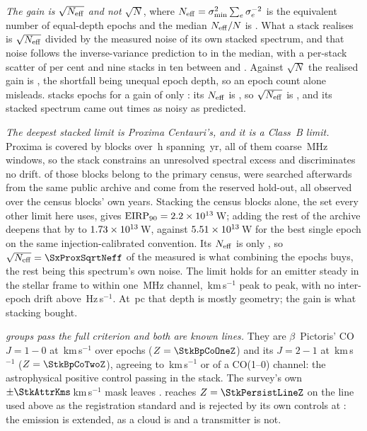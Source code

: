 \emph{The gain is $\sqrt{N_{\rm eff}}$ and not $\sqrt{N}$}, where
$N_{\rm eff}=\sigma_{\min}^{2}\sum_e\sigma_e^{-2}$ is the equivalent number of
equal-depth epochs and the median $N_{\rm eff}/N$ is \StkNeffFrac. What a
stack realises is $\sqrt{N_{\rm eff}}$ divided by the measured noise of its
own stacked spectrum, and that noise follows the inverse-variance prediction
to \StkGainVsNeff{} in the median, with a per-stack scatter of
\StkMadZScatterPct{} per cent and nine stacks in ten between \SzNoiseLo{} and
\SzNoiseHi. Against $\sqrt{N}$ the realised gain is \StkGainVsN, the
shortfall being unequal epoch depth, so an epoch count alone misleads.
\StkWorstStar{} stacks \StkWorstN{} epochs for a gain of only \StkWorstGain:
its $N_{\rm eff}$ is \StkWorstNeff, so $\sqrt{N_{\rm eff}}$ is
\SzWorstSqrtNeff, and its stacked spectrum came out \SzWorstNoise{} times as
noisy as predicted.

\emph{The deepest stacked limit is Proxima Centauri's, and it is a Class~B
limit.} Proxima is covered by \StkProxN{} blocks over \StkProxHours\,h
spanning \StkProxSpanYr\,yr, all of them coarse \ChanBModeMHz\,MHz windows,
so the stack constrains an unresolved spectral excess and discriminates no
drift. \SxProxEbCensus{} of those blocks belong to the primary census,
\SzProxEbSearched{} were searched afterwards from the same public archive and
\SzProxEbHold{} come from the reserved hold-out, all observed over the census
blocks' own years. Stacking the census blocks alone, the set every
other limit here uses, gives
$\mathrm{EIRP}_{90}=2.2\times10^{13}$\,W; adding the rest of the
archive deepens that by \SzProxDeepen{} to $1.73\times10^{13}$\,W, against
$5.51 \times 10^{13}$\,W for the best single epoch on the same
injection-calibrated convention. Its $N_{\rm eff}$ is only \StkProxNeff, so
$\sqrt{N_{\rm eff}}=\SxProxSqrtNeff$ of the measured \StkProxGain{} is what
combining the epochs buys, the rest being this spectrum's own noise. The limit
holds for an emitter steady in the stellar frame to within one
\ChanBModeMHz\,MHz channel,
\StkProxTolKms\,km\,s$^{-1}$ peak to peak, with no inter-epoch drift above
\StkProxDriftHzS\,Hz\,s$^{-1}$. At \StkProxDistPc\,pc that depth is mostly
geometry; the gain is what stacking bought.

\emph{\StkNSurvive{} groups pass the full criterion and both are known
lines.} They are $\beta$~Pictoris' CO $J=1\!-\!0$ at
\StkBpCoOneOff\,km\,s$^{-1}$ over \StkBpCoOneN{} epochs ($Z=\StkBpCoOneZ$)
and its $J=2\!-\!1$ at \StkBpCoTwoOff\,km\,s$^{-1}$ ($Z=\StkBpCoTwoZ$),
agreeing to \StkBpCrossKms\,km\,s$^{-1}$ or \StkBpCrossChan{} of a CO(1--0)
channel: the astrophysical positive control passing in the stack. The
survey's own $\pm\StkAttrKms$\,km\,s$^{-1}$ mask leaves
\StkUnattrClause. \StkPersistLineStar{} reaches
$Z=\StkPersistLineZ$ on the line used above as the registration standard and is
rejected by its own controls at \StkPersistLineCtrl: the emission is extended,
as a cloud is and a transmitter is not.

